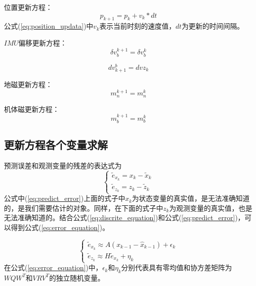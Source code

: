 \documentclass{article}
\begin{document}
位置更新方程：
\begin{equation}
	p_{k+1} = p_k + v_k * dt
	\label{eq:position_updata}
\end{equation}
公式(\ref{eq:position_updata})中$v_k$表示当前时刻的速度值，$dt$为更新的时间间隔。

$IMU$偏移更新方程：
\begin{equation}
	\delta v_b^{k+1} = 
	\delta v_b^k
\end{equation}

\begin{equation}
	dv^b_{k+1} = dvz_k
\end{equation}

地磁更新方程：
\begin{equation}
	m_n^{k+1} = m_n^k
\end{equation}

机体磁更新方程：
\begin{equation}
	m_b^{k+1} = m_b^k 
\end{equation}

\subsection{更新方程各个变量求解}
预测误差和观测变量的残差的表达式为
\begin{equation}
	\left\{
	\begin{array}{l}
	\tilde{e}_{x_k} = x_k - \tilde{x}_k \\
	\tilde{e}_{z_k} = z_k - \tilde{z}_k
	\end{array}
	\right.
	\label{eq:predict_error}
\end{equation}
公式中(\ref{eq:predict_error})上面的式子中$x_k$为状态变量的真实值，是无法准确知道的，是我们需要估计的对象。同样，在下面的式子中$z_k$为观测变量的真实值，也是无法准确知道的。结合公式(\ref{eq:discrite_equation})和公式(\ref{eq:predict_error})，可以得到公式(\ref{eq:error_equation})。

\begin{equation}
	\left\{
	\begin{array}{l}
	\tilde{e}_{x_k} \approx A(x_{k-1} - \hat{x}_{k-1}) + \epsilon_k \\
	\tilde{e}_{z_k} \approx H\tilde{e}_{x_k} + \eta_k
	\end{array}
	\right.
	\label{eq:error_equation}
\end{equation}
在公式(\ref{eq:error_equation})中，$\epsilon_k$和$\eta_k$分别代表具有零均值和协方差矩阵为$WQW^{T}$和$VRV^{T}$的独立随机变量。
\end{document}
